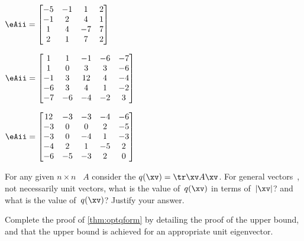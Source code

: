 \begin{exercise}
\begin{parts}
\item \(\eAii=\begin{bmatrix} -5&-1&1&2
\\-1&2&4&1
\\1&4&-7&7
\\2&1&7&2 \end{bmatrix}\)

\item \(\eAii=\begin{bmatrix} 1&1&-1&-6&-7
\\1&0&3&3&-6
\\-1&3&12&4&-4
\\-6&3&4&1&-2
\\-7&-6&-4&-2&3 \end{bmatrix}\)

\item \(\eAii=\begin{bmatrix} 12&-3&-3&-4&-6
\\-3&0&0&2&-5
\\-3&0&-4&1&-3
\\-4&2&1&-5&2
\\-6&-5&-3&2&0 \end{bmatrix}\)


\end{parts}
\end{exercise}







\begin{exercise} \label{ex:} 
For any given \(n\times n\) ~\(A\) consider the  \(q(\xv)=\tr\xv A\xv\). 
For general vectors~\xv, not necessarily unit vectors, what is the  value of~\(q(\xv)\) in terms of~\(|\xv|\)? and what is the  value of~\(q(\xv)\)?  
Justify your answer.
\end{exercise}





\begin{exercise} \label{ex:optqform} 
Complete the proof of \autoref{thm:optqform} by detailing the proof of the upper bound, and that the upper bound is achieved for an appropriate unit eigenvector.
\end{exercise}




